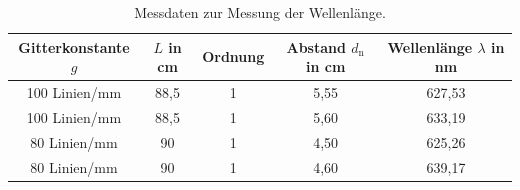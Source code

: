 \begin{table}
 \centering
 \caption{Messdaten zur Messung der Wellenlänge.}
 \label{tab:wel}
 \begin{tabular}{c c c c c}
   \toprule
   Gitterkonstante $g$ & $L$ in \si{\centi\meter}  & Ordnung & Abstand $d_\mathrm{n}$ in \si{\centi\meter} & Wellenlänge $\lambda$ in \si{\nano\meter} \\
   \midrule
   100 Linien/mm & 88,5 & 1 & 5,55  & 627,53 \\
   100 Linien/mm & 88,5 & 1 & 5,60 & 633,19 \\
   80 Linien/mm & 90 & 1 & 4,50  & 625,26 \\
   80 Linien/mm & 90 & 1 & 4,60 & 639,17 \\
   \bottomrule
 \end{tabular}
\end{table}
